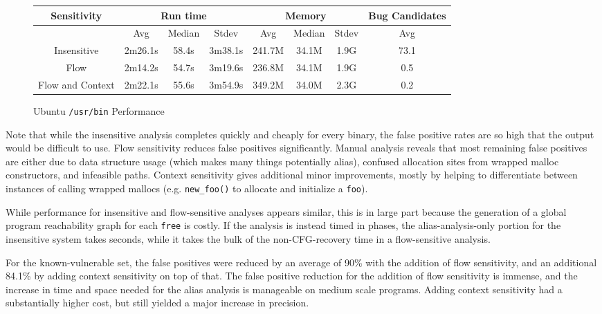 \begin{figure*}
	\begin{center}
	\begin{tabular}{|c||c|c|c||c|c|c||c|}
		\hline
		Sensitivity & \multicolumn{3}{c||}{Run time} & \multicolumn{3}{c||}{Memory} & Bug Candidates\\
		\hline
		& Avg & Median & Stdev & Avg & Median & Stdev  &Avg\\
		\hline\hline
		Insensitive  & 2m26.1s & 58.4s & 3m38.1s & 241.7M & 34.1M & 1.9G & 73.1\\ \hline
		Flow & 2m14.2s & 54.7s & 3m19.6s & 236.8M & 34.1M & 1.9G & 0.5 \\ \hline
		Flow and Context  & 2m22.1s & 55.6s & 3m54.9s & 349.2M & 34.0M & 2.3G & 0.2 \\ \hline
	\end{tabular}
	\end{center}
	\caption{Ubuntu \texttt{/usr/bin} Performance}
	\label{fig:ubperf}
\end{figure*}

Note that while the insensitive analysis completes quickly and cheaply for every binary, the false positive rates are so high that the output would be difficult to use.
Flow sensitivity reduces false positives significantly.
Manual analysis reveals that most remaining false positives are either due to data structure usage (which makes many things potentially alias), confused allocation sites from wrapped malloc constructors, and infeasible paths.
Context sensitivity gives additional minor improvements, mostly by helping to differentiate between instances of calling wrapped mallocs (e.g. \texttt{new\_foo()} to allocate and initialize a \texttt{foo}).

While performance for insensitive and flow-sensitive analyses appears similar, this is in large part because the generation of a global program reachability graph for each \texttt{free} is costly.
If the analysis is instead timed in phases, the alias-analysis-only portion for the insensitive system takes seconds, while it takes the bulk of the non-CFG-recovery time in a flow-sensitive analysis.

For the known-vulnerable set, the false positives were reduced by an average of 90\% with the addition of flow sensitivity, and an additional 84.1\% by adding context sensitivity on top of that.
The false positive reduction for the addition of flow sensitivity is immense, and the increase in time and space needed for the alias analysis is manageable on medium scale programs.
Adding context sensitivity had a substantially higher cost, but still yielded a major increase in precision.

